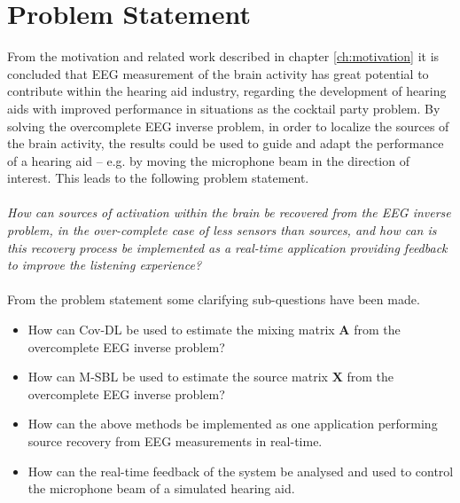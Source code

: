 \chapter{Problem Statement}
From the motivation and related work described in chapter \ref{ch:motivation} it is concluded that EEG measurement of the brain activity has great potential to contribute within the hearing aid industry, regarding the development of hearing aids with improved performance in situations as the cocktail party problem. 
By solving the overcomplete EEG inverse problem, in order to localize the sources of the brain activity, the results could be used to guide and adapt the performance of a hearing aid -- e.g. by moving the microphone beam in the direction of interest. 
This leads to the following problem statement.
\\ \\
\textit{How can sources of activation within the brain be recovered from the EEG inverse problem, in the over-complete case of less sensors than sources, and how can is this recovery process be implemented as a real-time application providing feedback to improve the listening experience?}
\\ \\
From the problem statement some clarifying sub-questions have been made.
\begin{itemize}
\item How can Cov-DL be used to estimate the mixing matrix $\mathbf{A}$ from the overcomplete EEG inverse problem?
\item How can M-SBL be used to estimate the source matrix $\mathbf{X}$ from the overcomplete EEG inverse problem?
\item How can the above methods be implemented as one application performing source recovery from EEG measurements in real-time. 
\item How can the real-time feedback of the system be analysed and used to control the microphone beam of a simulated hearing aid. 
\end{itemize}

 